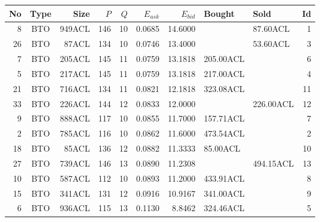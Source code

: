 \begin{tabular}{|r|c|r|r|r|r|r|p{2cm}|p{2cm}|r|}
\hline

No & Type & Size & $P$ & $Q$ & $E_{ask}$ & $E_{bid}$ & Bought & Sold & Id \\
\hline
8 & BTO & 949ACL & 146 & 10 & 0.0685 & 14.6000 &    & 87.60ACL & 1 \\
\hline
26 & BTO & 87ACL & 134 & 10 & 0.0746 & 13.4000 &    & 53.60ACL & 3 \\
\hline
7 & BTO & 205ACL & 145 & 11 & 0.0759 & 13.1818 & 205.00ACL &    & 6 \\
\hline
5 & BTO & 217ACL & 145 & 11 & 0.0759 & 13.1818 & 217.00ACL &    & 4 \\
\hline
21 & BTO & 716ACL & 134 & 11 & 0.0821 & 12.1818 & 323.08ACL &    & 11 \\
\hline
33 & BTO & 226ACL & 144 & 12 & 0.0833 & 12.0000 &    & 226.00ACL & 12 \\
\hline
9 & BTO & 888ACL & 117 & 10 & 0.0855 & 11.7000 & 157.71ACL &    & 7 \\
\hline
2 & BTO & 785ACL & 116 & 10 & 0.0862 & 11.6000 & 473.54ACL &    & 2 \\
\hline
18 & BTO & 85ACL & 136 & 12 & 0.0882 & 11.3333 & 85.00ACL &    & 10 \\
\hline
27 & BTO & 739ACL & 146 & 13 & 0.0890 & 11.2308 &    & 494.15ACL & 13 \\
\hline
10 & BTO & 587ACL & 112 & 10 & 0.0893 & 11.2000 & 433.91ACL &    & 8 \\
\hline
15 & BTO & 341ACL & 131 & 12 & 0.0916 & 10.9167 & 341.00ACL &    & 9 \\
\hline
6 & BTO & 936ACL & 115 & 13 & 0.1130 & 8.8462 & 324.46ACL &    & 5 \\
\hline
\end{tabular}
